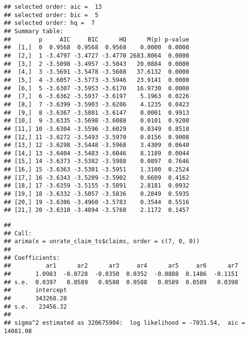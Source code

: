 \documentclass[]{article}
\newenvironment{Shaded}{\begin{snugshade}}{\end{snugshade}}
\newcommand{\KeywordTok}[1]{\textcolor[rgb]{0.13,0.29,0.53}{\textbf{#1}}}
\newcommand{\DataTypeTok}[1]{\textcolor[rgb]{0.13,0.29,0.53}{#1}}
\newcommand{\DecValTok}[1]{\textcolor[rgb]{0.00,0.00,0.81}{#1}}
\newcommand{\StringTok}[1]{\textcolor[rgb]{0.31,0.60,0.02}{#1}}
\newcommand{\OtherTok}[1]{\textcolor[rgb]{0.56,0.35,0.01}{#1}}
\newcommand{\OperatorTok}[1]{\textcolor[rgb]{0.81,0.36,0.00}{\textbf{#1}}}
\newcommand{\NormalTok}[1]{#1}
\begin{document}
\begin{verbatim}
## selected order: aic =  13 
## selected order: bic =  5 
## selected order: hq =  7 
## Summary table:  
##        p     AIC     BIC      HQ      M(p) p-value
##  [1,]  0  0.9568  0.9568  0.9568    0.0000  0.0000
##  [2,]  1 -3.4797 -3.4727 -3.4770 2683.8064  0.0000
##  [3,]  2 -3.5098 -3.4957 -3.5043   20.0884  0.0000
##  [4,]  3 -3.5691 -3.5478 -3.5608   37.6132  0.0000
##  [5,]  4 -3.6057 -3.5773 -3.5946   23.9141  0.0000
##  [6,]  5 -3.6307 -3.5953 -3.6170   16.9730  0.0000
##  [7,]  6 -3.6362 -3.5937 -3.6197    5.1963  0.0226
##  [8,]  7 -3.6399 -3.5903 -3.6206    4.1235  0.0423
##  [9,]  8 -3.6367 -3.5801 -3.6147    0.0001  0.9913
## [10,]  9 -3.6335 -3.5698 -3.6088    0.0101  0.9200
## [11,] 10 -3.6304 -3.5596 -3.6029    0.0349  0.8518
## [12,] 11 -3.6272 -3.5493 -3.5970    0.0156  0.9008
## [13,] 12 -3.6298 -3.5448 -3.5968    3.4309  0.0640
## [14,] 13 -3.6404 -3.5483 -3.6046    8.1189  0.0044
## [15,] 14 -3.6373 -3.5382 -3.5988    0.0897  0.7646
## [16,] 15 -3.6363 -3.5301 -3.5951    1.3100  0.2524
## [17,] 16 -3.6343 -3.5209 -3.5902    0.6609  0.4162
## [18,] 17 -3.6359 -3.5155 -3.5891    2.8181  0.0932
## [19,] 18 -3.6332 -3.5057 -3.5836    0.2849  0.5935
## [20,] 19 -3.6306 -3.4960 -3.5783    0.3544  0.5516
## [21,] 20 -3.6310 -3.4894 -3.5760    2.1172  0.1457
\end{verbatim}

\begin{Shaded}
\end{Shaded}

\begin{verbatim}
## 
## Call:
## arima(x = unrate_claim_ts$claims, order = c(7, 0, 0))
## 
## Coefficients:
##          ar1      ar2      ar3     ar4      ar5     ar6      ar7
##       1.0983  -0.0728  -0.0350  0.0352  -0.0888  0.1486  -0.1151
## s.e.  0.0397   0.0589   0.0588  0.0588   0.0589  0.0589   0.0398
##       intercept
##       343268.28
## s.e.   23456.32
## 
## sigma^2 estimated as 320675904:  log likelihood = -7031.54,  aic = 14081.08
\end{verbatim}

\begin{Shaded}
\end{Shaded}
\end{document}
